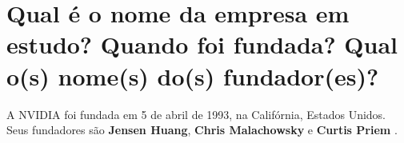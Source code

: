 \section{Qual é o nome da empresa em estudo? Quando foi fundada? Qual o(s) nome(s) do(s) fundador(es)?}

A NVIDIA foi fundada em 5 de abril de 1993, na Califórnia, Estados Unidos. Seus fundadores são \textbf{Jensen Huang}, \textbf{Chris Malachowsky} e \textbf{Curtis Priem} \cite{nvidia_1993}.
